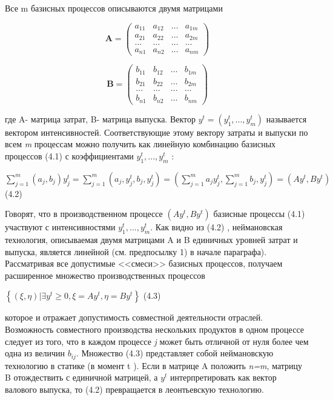 \documentclass[12pt, 4paper]{book}
\begin{document}
{Все m базисных процессов описываются двумя матрицами

\begin{center}
\begin{displaymath}
\mathbf{A} =
\left( \begin{array}{cccc}
a_{11} & a_{12} & \ldots & a_{1m} \\
a_{21} & a_{22} & \ldots & a_{2m} \\
\ldots & \ldots & \ldots & \ldots \\
a_{n1} & a_{n2} & \ldots & a_{nm} 
\end{array} \right)
\end{displaymath}
\end{center}
\begin{center}
\begin{displaymath}
\mathbf{B} =
\left( \begin{array}{cccc}
b_{11} & b_{12} & \ldots & b_{1m} \\
b_{21} & b_{22} & \ldots & b_{2m} \\
\ldots & \ldots & \ldots & \ldots \\
b_{n1} & b_{n2} & \ldots & b_{nm} 
\end{array} \right)
\end{displaymath}
\end{center}
где A- матрица затрат, B- матрица выпуска. Вектор $y^t=(y_{1}^t,...,y_{m}^t)$ называется вектором интенсивностей. Соответствующие этому вектору затраты и выпуски по всем \textit{m} процессам можно получить как линейную комбинацию базисных процессов (4.1) с коэффициентами $y_{1}^t,...,y_{m}^t$ :
\begin{center}
$\sum\limits_{j=1}^{m}(a_j,b_j)y_{j}^{t}=\sum\limits_{j=1}^{m}(a_j,y_{j}^{t},b_j,y_{j}^t)=(\sum\limits_{j=1}^{m}a_j y_{j}^t,\sum\limits_{j=1}^{m} b_j,y_{j}^t) = (A y^{t},B y^t)$ (4.2)
\end{center}
\par

Говорят, что в производственном процессе $(A y^{t},B y^t)$ базисные процессы (4.1) участвуют с интенсивностями  $y_{1}^t,...,y_{m}^t$. Как видно из (4.2) , неймановская технология, описываемая двумя матрицами A и B единичных уровней затрат и выпуска, является линейной (см. предпосылку 1) в начале параграфа). Рассматривая все допустимые <<смеси>> базисных процессов, получаем расширенное множество производственных процессов
\begin{center}
$\left\{ (\xi,\eta)| \exists y^t \geq 0 , \xi = A y^t, \eta = B y^t \right\}$ (4.3)
\end{center}
которое и отражает допустимость совместной деятельности отраслей. Возможность совместного производства нескольких продуктов в одном процессе следует из того, что в каждом процессе \textit{j} может быть отличной от нуля более чем одна из величин $b_{ij}$. Множество (4.3) представляет собой неймановскую технологию в статике (в момент t ). Если в матрице A положить \textit{n=m}, матрицу B отождествить с единичной матрицей, а $y^t$ интерпретировать как вектор валового выпуска, то (4.2) превращается в леонтьевскую технологию.
\par

}
\end{document}
